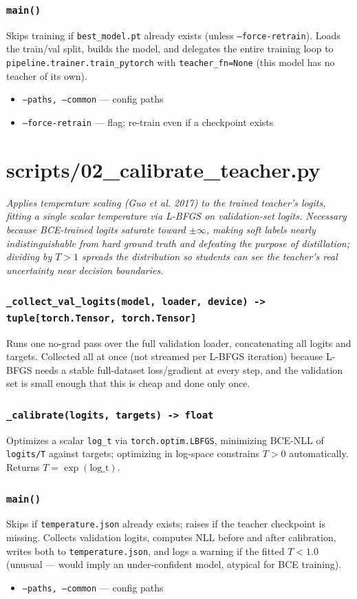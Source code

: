 \documentclass[11pt]{article}
\newcommand{\role}[1]{\par\noindent\textit{#1}\par\vspace{0.5em}}
\newcommand{\func}[1]{\subsubsection*{\texttt{#1}}}
\newcommand{\cliarg}[2]{\item \texttt{#1} --- #2}
\begin{document}
\func{main()}
Skips training if \texttt{best\_model.pt} already exists (unless
\texttt{--force-retrain}). Loads the train/val split, builds the model, and
delegates the entire training loop to \texttt{pipeline.trainer.train\_pytorch}
with \texttt{teacher\_fn=None} (this model has no teacher of its own).

\begin{itemize}[nosep]
\cliarg{--paths, --common}{config paths}
\cliarg{--force-retrain}{flag; re-train even if a checkpoint exists}
\end{itemize}

\section{scripts/02\_calibrate\_teacher.py}
\role{Applies temperature scaling (Guo et al. 2017) to the trained teacher's
logits, fitting a single scalar temperature via L-BFGS on validation-set
logits. Necessary because BCE-trained logits saturate toward $\pm\infty$, making
soft labels nearly indistinguishable from hard ground truth and defeating the
purpose of distillation; dividing by $T>1$ spreads the distribution so students
can see the teacher's real uncertainty near decision boundaries.}

\func{\_collect\_val\_logits(model, loader, device) -> tuple[torch.Tensor, torch.Tensor]}
Runs one no-grad pass over the full validation loader, concatenating all logits
and targets. Collected all at once (not streamed per L-BFGS iteration) because
L-BFGS needs a stable full-dataset loss/gradient at every step, and the
validation set is small enough that this is cheap and done only once.

\func{\_calibrate(logits, targets) -> float}
Optimizes a scalar \texttt{log\_t} via \texttt{torch.optim.LBFGS}, minimizing
BCE-NLL of \texttt{logits/T} against targets; optimizing in log-space
constrains $T>0$ automatically. Returns $T = \exp(\text{log\_t})$.

\func{main()}
Skips if \texttt{temperature.json} already exists; raises if the teacher
checkpoint is missing. Collects validation logits, computes NLL before and
after calibration, writes both to \texttt{temperature.json}, and logs a warning
if the fitted $T < 1.0$ (unusual --- would imply an under-confident model,
atypical for BCE training).

\begin{itemize}[nosep]
\cliarg{--paths, --common}{config paths}
\end{itemize}
\end{document}
